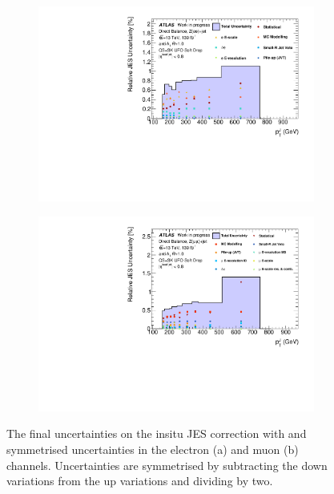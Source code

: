 \begin{figure}[t]
\centering
\begin{subfigure}[b]{\textwidth}
    \centering
    \includegraphics[width=\textwidth]{plots/insitu/systtotal_zee_WIP.pdf}
    \caption{\vspace{20pt}}
\end{subfigure}
\hfill
\begin{subfigure}[b]{\textwidth}
    \centering
    \includegraphics[width=\textwidth]{plots/insitu/systtotal_zmm_WIP.pdf}
    \caption{}
\end{subfigure}
\caption{The final uncertainties on the insitu JES correction with \ptJ and symmetrised uncertainties in the electron (a) and muon (b) channels. Uncertainties are symmetrised by subtracting the down variations from the up variations and dividing by two.\label{fig:insitu:systs}}
\end{figure}

